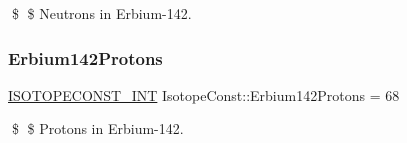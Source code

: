 \$ \$ Neutrons in Erbium-\/142. \mbox{\label{group___isotope_const-_erbium-_er142_gad357ac460ccf781ef126c03c1e810033}} 
\subsubsection{\texorpdfstring{Erbium142\+Protons}{Erbium142Protons}}
{\footnotesize\ttfamily \mbox{\hyperlink{group___isotope_const-_macros_ga5f18360b3e99483a35c32d789e62621c}{I\+S\+O\+T\+O\+P\+E\+C\+O\+N\+S\+T\+\_\+\+I\+NT}} Isotope\+Const\+::\+Erbium142\+Protons = 68}

\$ \$ Protons in Erbium-\/142. 